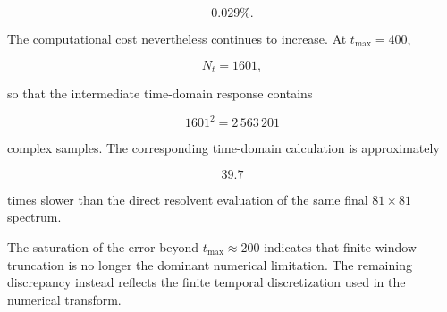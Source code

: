 \documentclass[11pt]{article}
\begin{document}
\begin{equation}
0.029\%.
\end{equation}

The computational cost nevertheless continues to increase.  At
$t_{\max}=400$,

\begin{equation}
N_t=1601,
\end{equation}

so that the intermediate time-domain response contains

\begin{equation}
\boxed{
1601^2
=
2\,563\,201
}
\end{equation}

complex samples.  The corresponding time-domain calculation is
approximately

\begin{equation}
\boxed{
39.7
}
\end{equation}

times slower than the direct resolvent evaluation of the same final
$81\times81$ spectrum.

The saturation of the error beyond $t_{\max}\approx200$ indicates that
finite-window truncation is no longer the dominant numerical
limitation.  The remaining discrepancy instead reflects the finite
temporal discretization used in the numerical transform.
\end{document}
